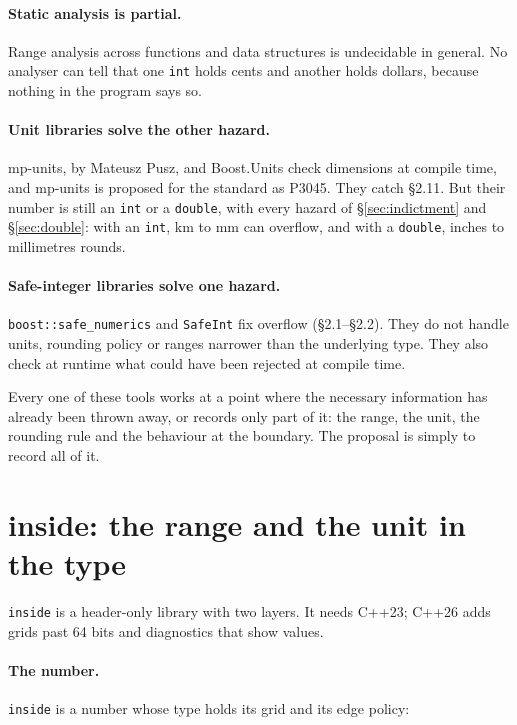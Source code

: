 \documentclass[11pt,a4paper]{article}
\newcommand{\code}[1]{\texttt{\small #1}}
\begin{document}
\paragraph{Static analysis is partial.} Range analysis across functions and
data structures is undecidable in general. No analyser can tell that one
\code{int} holds cents and another holds dollars, because nothing in the
program says so.

\paragraph{Unit libraries solve the other hazard.} mp-units, by Mateusz Pusz,
and Boost.Units check dimensions at compile time, and mp-units is proposed for
the standard as P3045. They catch \S2.11. But their number is still an
\code{int} or a \code{double}, with every hazard of \S\ref{sec:indictment} and
\S\ref{sec:double}: with an \code{int}, km to mm can overflow, and with a
\code{double}, inches to millimetres rounds.

\paragraph{Safe-integer libraries solve one hazard.} \code{boost::safe\_numerics}
and \code{SafeInt} fix overflow (\S2.1--\S2.2). They do not handle units,
rounding policy or ranges narrower than the underlying type. They also check at
runtime what could have been rejected at compile time.

\medskip
\noindent
Every one of these tools works at a point where the necessary information has
already been thrown away, or records only part of it: the range, the unit, the
rounding rule and the behaviour at the boundary. The proposal is simply to
record all of it.

\section{inside: the range and the unit in the type}\label{sec:inside}

\code{inside} is a header-only library with two layers. It needs C++23; C++26
adds grids past 64 bits and diagnostics that show values.

\paragraph{The number.} \code{inside} is a number whose type holds its grid
and its edge policy:
\end{document}
